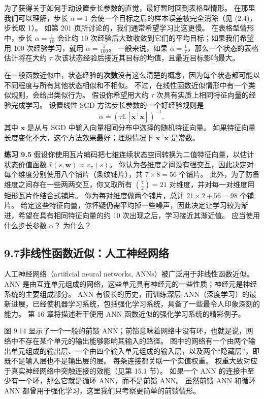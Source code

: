 \documentclass[UTF8,12pt,a4paper,fontset=fandol]{ctexart}
\begin{document}
为了获得关于如何手动设置步长参数的直觉，最好暂时回到表格型情形。
在那里我们可以理解，步长 $\alpha=1$ 会使一个目标之后的样本误差被完全消除（见 (2.4)，步长取 1）。
如第 201 页所讨论的，我们通常希望学习比这更慢。
在表格型情形中，步长 $\alpha=\frac{1}{10}$ 会让约 10 次经验后大致收敛到它们的平均目标；如果我们希望用 100 次经验学习，就用 $\alpha=\frac{1}{100}$。
一般来说，如果 $\alpha=\frac{1}{\tau}$，那么一个状态的表格估计将在大约 $\tau$ 次该状态经验后接近其目标的均值，且最近目标影响最大。

在一般函数近似中，状态经验的\textbf{次数}没有这么清楚的概念，因为每个状态都可能以不同程度与所有其他状态相似和不相似。
不过，在线性函数近似情形中有一个类似规则，会给出类似行为。
假设你希望用大约 $\tau$ 次具有实质上相同特征向量的经验完成学习。
设置线性 SGD 方法步长参数的一个好经验规则是
\begin{equation}
\alpha\doteq \left(\tau\mathbb{E}[\mathbf{x}^\top\mathbf{x}]\right)^{-1},
\tag{9.19}
\end{equation}
其中 $\mathbf{x}$ 是从与 SGD 中输入向量相同分布中选择的随机特征向量。
如果特征向量长度变化不大，这个方法效果最好；理想情况下 $\mathbf{x}^\top\mathbf{x}$ 是常数。

\noindent\textbf{练习 9.5}
假设你使用瓦片编码把七维连续状态空间转换为二值特征向量，以估计状态价值函数 $\hat{v}(s,\mathbf{w})\approx v_\pi(s)$。
你认为各维度之间没有强交互，因此决定对每个维度分别使用八个铺片（条纹铺片），共 $7\times8=56$ 个铺片。
此外，为了防备维度之间存在一些两两交互，你又取所有 $\binom{7}{2}=21$ 对维度，并对每一对维度用矩形瓦片作结合式铺片。
你为每对维度做两个铺片，总计 $21\times2+56=98$ 个铺片。
给定这些特征向量，你怀疑仍需平均掉一些噪声，因此决定让学习较为渐进，希望在具有相同特征向量的约 10 次出现之后，学习接近其渐近值。
应当使用什么步长参数 $\alpha$？
为什么？

\subsection*{9.7\quad 非线性函数近似：人工神经网络}

人工神经网络（artificial neural networks, ANNs）被广泛用于非线性函数近似。
ANN 是由互连单元组成的网络，这些单元具有神经元的一些性质；神经元是神经系统的主要组成部分。
ANN 有很长的历史，而训练深层 ANN（深度学习）的最新进展，已经使机器学习系统，包括强化学习系统，具备了一些最令人印象深刻的能力。
第 16 章将描述若干使用 ANN 函数近似的强化学习系统的精彩例子。

图 9.14 显示了一个一般的前馈 ANN；前馈意味着网络中没有环，也就是说，网络中不存在某个单元的输出能够影响其输入的路径。
图中的网络有一个由两个输出单元组成的输出层、一个由四个输入单元组成的输入层，以及两个“隐藏层”，即既不是输入层也不是输出层的层。
每条连接都关联一个实值权重。
权重大致对应于真实神经网络中突触连接的效能（见第 15.1 节）。
如果一个 ANN 的连接中至少有一个环，那么它就是循环 ANN，而不是前馈 ANN。
虽然前馈 ANN 和循环 ANN 都曾用于强化学习，这里我们只考察更简单的前馈情形。
\end{document}
